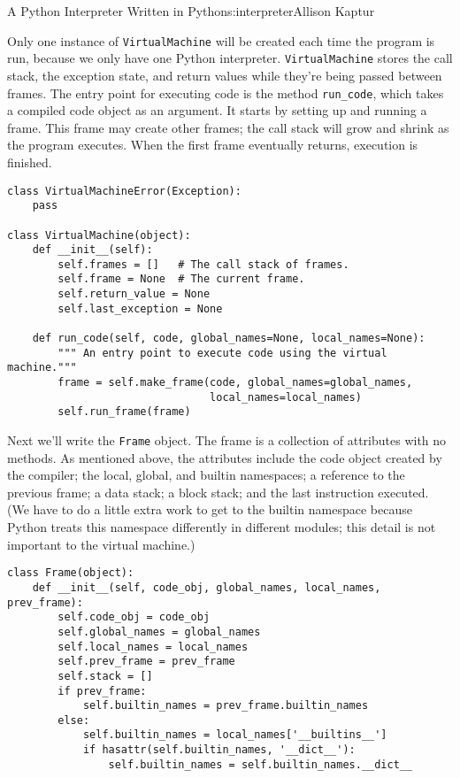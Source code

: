 \begin{aosachapter}{A Python Interpreter Written in Python}{s:interpreter}{Allison Kaptur}
\label{the-virtualmachine-class}

Only one instance of \texttt{VirtualMachine} will be created each time
the program is run, because we only have one Python interpreter.
\texttt{VirtualMachine} stores the call stack, the exception state, and
return values while they're being passed between frames. The entry point
for executing code is the method \texttt{run\_code}, which takes a
compiled code object as an argument. It starts by setting up and running
a frame. This frame may create other frames; the call stack will grow
and shrink as the program executes. When the first frame eventually
returns, execution is finished.

\begin{verbatim}
class VirtualMachineError(Exception):
    pass

class VirtualMachine(object):
    def __init__(self):
        self.frames = []   # The call stack of frames.
        self.frame = None  # The current frame.
        self.return_value = None
        self.last_exception = None

    def run_code(self, code, global_names=None, local_names=None):
        """ An entry point to execute code using the virtual machine."""
        frame = self.make_frame(code, global_names=global_names, 
                                local_names=local_names)
        self.run_frame(frame)
\end{verbatim}

\label{the-frame-class}

Next we'll write the \texttt{Frame} object. The frame is a collection of
attributes with no methods. As mentioned above, the attributes include
the code object created by the compiler; the local, global, and builtin
namespaces; a reference to the previous frame; a data stack; a block
stack; and the last instruction executed. (We have to do a little extra
work to get to the builtin namespace because Python treats this
namespace differently in different modules; this detail is not important
to the virtual machine.)

\begin{verbatim}
class Frame(object):
    def __init__(self, code_obj, global_names, local_names, prev_frame):
        self.code_obj = code_obj
        self.global_names = global_names
        self.local_names = local_names
        self.prev_frame = prev_frame
        self.stack = []
        if prev_frame:
            self.builtin_names = prev_frame.builtin_names
        else:
            self.builtin_names = local_names['__builtins__']
            if hasattr(self.builtin_names, '__dict__'):
                self.builtin_names = self.builtin_names.__dict__


\end{verbatim}
\end{aosachapter}
